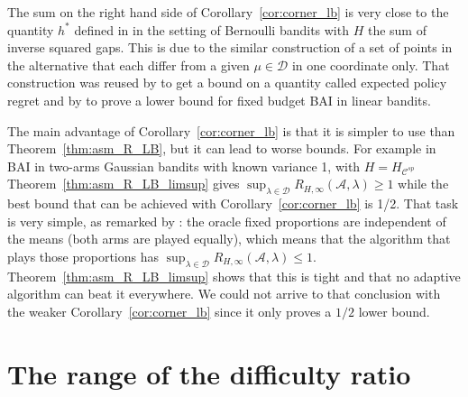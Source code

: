 \documentclass{article}
\begin{document}
The sum on the right hand side of Corollary~\ref{cor:corner_lb} is very close to the quantity $h^*$ defined in \cite{carpentier2016tight} in the setting of Bernoulli bandits with $H$ the sum of inverse squared gaps. This is due to the similar construction of a set of points in the alternative that each differ from a given $\mu \in \mathcal D$ in one coordinate only. That construction was reused by \cite{ariu2021policy} to get a bound on a quantity called expected policy regret and by \cite{yangminimax} to prove a lower bound for fixed budget BAI in linear bandits.

The main advantage of Corollary~\ref{cor:corner_lb} is that it is simpler to use than Theorem~\ref{thm:asm_R_LB}, but it can lead to worse bounds. For example in BAI in two-arms Gaussian bandits with known variance 1, with $H = H_{\mathcal C^{sp}}$ Theorem~\ref{thm:asm_R_LB_limsup} gives $\sup_{\lambda\in \mathcal D} R_{H, \infty}(\mathcal A, \lambda) \ge 1$ while the best bound that can be achieved with Corollary~\ref{cor:corner_lb} is 1/2.
That task is very simple, as remarked by \cite{kaufmann2016complexity}: the oracle fixed proportions are independent of the means (both arms are played equally), which means that the algorithm that plays those proportions has $\sup_{\lambda\in \mathcal D} R_{H, \infty}(\mathcal A, \lambda) \le 1$.
Theorem~\ref{thm:asm_R_LB_limsup} shows that this is tight and that no adaptive algorithm can beat it everywhere.
We could not arrive to that conclusion with the weaker Corollary~\ref{cor:corner_lb} since it only proves a $1/2$ lower bound.



\section{The range of the difficulty ratio}
\label{sec:the_range_of_the_difficulty_ratio}
\end{document}
